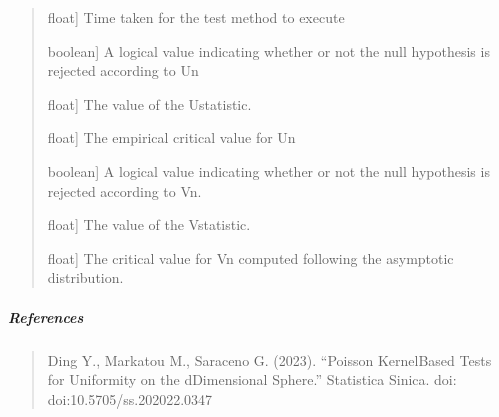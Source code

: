 \documentclass[letterpaper,10pt,english,openany,oneside]{sphinxmanual}
\begin{document}
\begin{fulllineitems}
\begin{quote}
\begin{description}
\sphinxlineitem{execution\_time}{[}float{]}
\sphinxAtStartPar
Time taken for the test method to execute

\sphinxlineitem{u\_statistic\_h0\_}{[}boolean{]}
\sphinxAtStartPar
A logical value indicating whether or not the null hypothesis 
is rejected according to Un

\sphinxlineitem{u\_statistic\_un\_}{[}float{]}
\sphinxAtStartPar
The value of the U\sphinxhyphen{}statistic.

\sphinxlineitem{u\_statistic\_cv\_}{[}float{]}
\sphinxAtStartPar
The empirical critical value for Un

\sphinxlineitem{v\_statistic\_h0\_}{[}boolean{]}
\sphinxAtStartPar
A logical value indicating whether or not the null hypothesis is 
rejected according to Vn.

\sphinxlineitem{v\_statistic\_vn\_}{[}float{]}
\sphinxAtStartPar
The value of the V\sphinxhyphen{}statistic.

\sphinxlineitem{v\_statistic\_cv\_}{[}float{]}
\sphinxAtStartPar
The critical value for Vn computed following the asymptotic distribution.

\end{description}
\end{quote}


\subparagraph{References}
\label{\detokenize{api_reference/generated/QuadratiK.poisson_kernel_test.PoissonKernelTest:references}}\begin{quote}

\sphinxAtStartPar
Ding Y., Markatou M., Saraceno G. (2023). “Poisson Kernel\sphinxhyphen{}Based Tests for
Uniformity on the d\sphinxhyphen{}Dimensional Sphere.” Statistica Sinica. doi: doi:10.5705/ss.202022.0347
\end{quote}



\end{fulllineitems}
\end{document}
